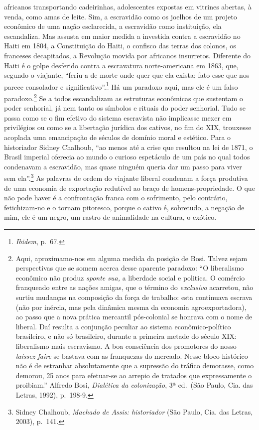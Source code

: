 africanos transportando cadeirinhas, adolescentes expostas em vitrines
abertas, à venda, como amas de leite. Sim, a escravidão como os joelhos
de um projeto econômico de uma nação esclarecida, a escravidão como
instituição, ela escandaliza. Mas assusta em maior medida a investida
contra a escravidão no Haiti em 1804, a Constituição do Haiti, o
confisco das terras dos colonos, os franceses decapitados, a Revolução
movida por africanos insurretos. Diferente do Haiti é o golpe desferido
contra a escravatura norte-americana em 1863, que, segundo o viajante,
``feriu-a de morte onde quer que ela exista; fato esse que nos parece
consolador e significativo''.\footnote{\textit{Ibidem}, p.~67.} Há um
paradoxo aqui, mas ele é um falso paradoxo.\footnote{Aqui,
  aproximamo-nos em alguma medida da posição de Bosi. Talvez sejam
  perspectivas que se somem acerca desse aparente paradoxo: ``O
  liberalismo econômico não produz \textit{sponte sua,} a liberdade social
  e politica. O comércio franqueado entre as nações amigas, que o
  término do \textit{exclusivo} acarretou, não surtiu mudanças na
  composição da força de trabalho: esta continuava escrava (não por
  inércia, mas pela dinâmica mesma da economia agroexportadora), ao
  passo que a nova prática mercantil pós-colonial se honrava com o nome
  de liberal. Daí resulta a conjunção peculiar ao sistema
  econômico-político brasileiro, e não só brasileiro, durante a primeira
  metade do século XIX: liberalismo mais escravismo. A boa consciência
  dos promotores do nosso \textit{laissez-faire} se bastava com as
  franquezas do mercado. Nesse bloco histórico não é de estranhar
  absolutamente que a supressão do tráfico demorasse, como demorou, 25
  anos para efetuar-se ao arrepio de tratados que expressamente o
  proibiam.'' Alfredo Bosi, \textit{Dialética da colonização}, 3ª ed.~(São
  Paulo, Cia. das Letras, 1992), p.~198-9.} Se a todos escandalizam as
estruturas econômicas que sustentam o poder senhorial, já nem tanto os
símbolos e rituais do poder senhorial. Tudo se passa como se o fim
efetivo do sistema escravista não implicasse mexer em privilégios ou
como se a libertação jurídica dos cativos, no fim do XIX, trouxesse
acoplada uma emancipação de séculos de domínio moral e estético. Para o
historiador Sidney Chalhoub, ``ao menos até a crise que resultou na lei
de 1871, o Brasil imperial oferecia ao mundo o curioso espetáculo de um
país no qual todos condenavam a escravidão, mas quase ninguém queria dar
um passo para viver sem ela''.\footnote{Sidney Chalhoub, \textit{Machado
  de Assis: historiador} (São Paulo, Cia. das Letras, 2003), p.~141.} As
palavras de ordem do viajante liberal condenam a força produtiva de uma
economia de exportação redutível ao braço de homens-propriedade. O que
não pode haver é a confrontação franca com o sofrimento, pelo contrário,
fetichizam-no e o tornam pitoresco, porque o cativo é, sobretudo, a
negação de mim, ele é um negro, um rastro de animalidade na cultura, o
exótico.

